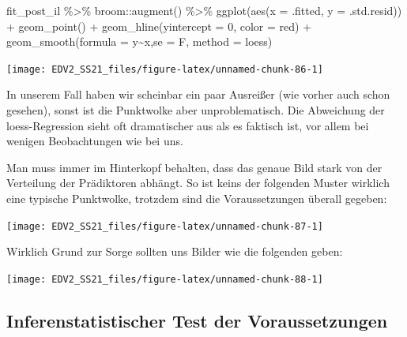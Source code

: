 \documentclass[
]{book}
\newenvironment{Shaded}{\begin{snugshade}}{\end{snugshade}}
\newcommand{\AttributeTok}[1]{\textcolor[rgb]{0.77,0.63,0.00}{#1}}
\newcommand{\DecValTok}[1]{\textcolor[rgb]{0.00,0.00,0.81}{#1}}
\newcommand{\FunctionTok}[1]{\textcolor[rgb]{0.00,0.00,0.00}{#1}}
\newcommand{\NormalTok}[1]{#1}
\newcommand{\SpecialCharTok}[1]{\textcolor[rgb]{0.00,0.00,0.00}{#1}}
\newcommand{\StringTok}[1]{\textcolor[rgb]{0.31,0.60,0.02}{#1}}
\begin{document}
\begin{Shaded}
\begin{Highlighting}[]
\NormalTok{fit\_post\_il }\SpecialCharTok{\%\textgreater{}\%} 
\NormalTok{  broom}\SpecialCharTok{::}\FunctionTok{augment}\NormalTok{() }\SpecialCharTok{\%\textgreater{}\%}
  \FunctionTok{ggplot}\NormalTok{(}\FunctionTok{aes}\NormalTok{(}\AttributeTok{x =}\NormalTok{ .fitted, }\AttributeTok{y =}\NormalTok{ .std.resid)) }\SpecialCharTok{+}
  \FunctionTok{geom\_point}\NormalTok{() }\SpecialCharTok{+}
  \FunctionTok{geom\_hline}\NormalTok{(}\AttributeTok{yintercept =} \DecValTok{0}\NormalTok{, }\AttributeTok{color =} \StringTok{\textquotesingle{}red\textquotesingle{}}\NormalTok{) }\SpecialCharTok{+}
  \FunctionTok{geom\_smooth}\NormalTok{(}\AttributeTok{formula =} \StringTok{\textquotesingle{}y\textasciitilde{}x\textquotesingle{}}\NormalTok{,}\AttributeTok{se =}\NormalTok{ F, }\AttributeTok{method =} \StringTok{\textquotesingle{}loess\textquotesingle{}}\NormalTok{)}
\end{Highlighting}
\end{Shaded}

\begin{center}\texttt{[image: EDV2\_SS21\_files/figure-latex/unnamed-chunk-86-1]} \end{center}

In unserem Fall haben wir scheinbar ein paar Ausreißer (wie vorher auch schon gesehen), sonst ist die Punktwolke aber unproblematisch. Die Abweichung der loess-Regression sieht oft dramatischer aus als es faktisch ist, vor allem bei wenigen Beobachtungen wie bei uns.

Man muss immer im Hinterkopf behalten, dass das genaue Bild stark von der Verteilung der Prädiktoren abhängt. So ist keins der folgenden Muster wirklich eine typische Punktwolke, trotzdem sind die Voraussetzungen überall gegeben:

\begin{center}\texttt{[image: EDV2\_SS21\_files/figure-latex/unnamed-chunk-87-1]} \end{center}

Wirklich Grund zur Sorge sollten uns Bilder wie die folgenden geben:

\begin{center}\texttt{[image: EDV2\_SS21\_files/figure-latex/unnamed-chunk-88-1]} \end{center}

\hypertarget{inferenstatistischer-test-der-voraussetzungen}{%
\subsection{Inferenstatistischer Test der Voraussetzungen}\label{inferenstatistischer-test-der-voraussetzungen}}
\end{document}
